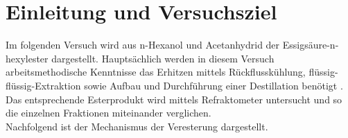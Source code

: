 \section{Einleitung und Versuchsziel}
\label{sec:aufgabenstellung}

Im folgenden Versuch wird aus n-Hexanol und Acetanhydrid der Essigsäure-n-hexylester dargestellt. Hauptsächlich werden in diesem Versuch arbeitsmethodische Kenntnisse das Erhitzen mittels Rückflusskühlung, flüssig-flüssig-Extraktion sowie Aufbau und Durchführung einer Destillation benötigt . Das entsprechende Esterprodukt wird mittels Refraktometer untersucht und so die einzelnen Fraktionen miteinander verglichen.\\
Nachfolgend ist der Mechanismus der Veresterung dargestellt.


